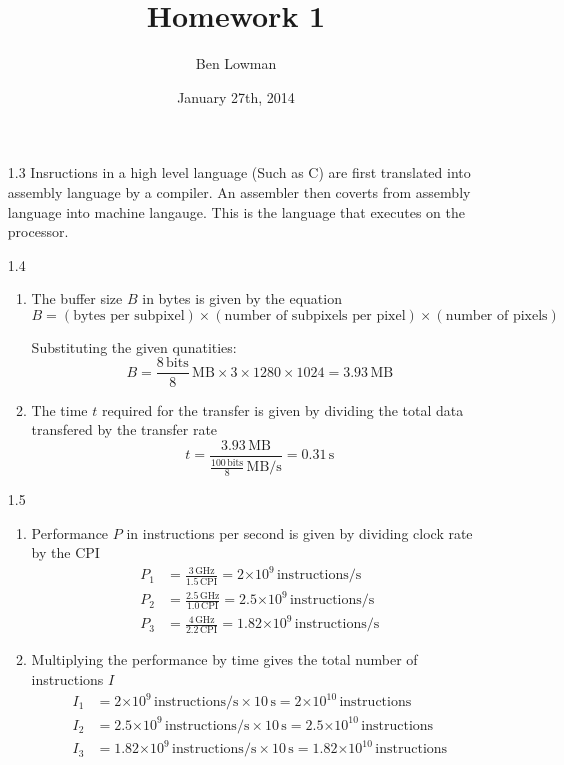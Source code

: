 \documentclass[12pt]{article}
\title{\textbf{Homework 1}}
\author{Ben Lowman}
\date{January 27th, 2014}
\newcommand{\e}[1]{\ensuremath{\times 10^{#1}}}
\newcommand{\un}[1]{\ensuremath{\, \mathrm{#1}}}
\begin{document}
\maketitle

\begin{itemize}
	
	\item [1.3] Insructions in a high level language (Such as C) are first translated into assembly language by a compiler. An assembler then coverts from assembly language into machine langauge. This is the language that executes on the processor.
	
	\item [1.4]
	\begin{enumerate}
		\item The buffer size $B$ in bytes is given by the equation
			\[B = (\text{bytes per subpixel}) \times (\text{number of subpixels per pixel}) \times (\text{number of pixels})\]

			Substituting the given qunatities:
			\[B = \frac{8\un{bits}}{8}\un{MB} \times 3 \times 1280 \times 1024 = 3.93 \un{MB}\]
		\item The time $t$ required for the transfer is given by dividing the total data transfered by the transfer rate
			\[t = \frac{3.93 \un{MB}}{\frac{100\un{bits}}{8} \un{MB/s}} =0.31 \un{s} \]
	\end{enumerate}

	\item [1.5]
	\begin{enumerate}
		\item Performance $P$ in instructions per second is given by dividing clock rate by the CPI 
			\begin{align*}
				P_1 &= \frac{3 \un{GHz}}{1.5\un{CPI}} = 2\e{9}\un{instructions/s}\\
				P_2 &= \frac{2.5 \un{GHz}}{1.0\un{CPI}} = 2.5\e{9}\un{instructions/s} \\
				P_3 &= \frac{4 \un{GHz}}{2.2\un{CPI}} = 1.82\e{9}\un{instructions/s}
			\end{align*}

		\item Multiplying the performance by time gives the total number of instructions $I$
			\begin{align*}
				I_1 &= 2\e{9}\un{instructions/s} \times 10\un{s} = 2\e{10}\un{instructions}\\
				I_2 &= 2.5\e{9}\un{instructions/s} \times 10\un{s} = 2.5\e{10}\un{instructions} \\
				I_3 &= 1.82\e{9}\un{instructions/s} \times 10\un{s} = 1.82\e{10}\un{instructions}
			\end{align*}
			

\end{enumerate}
\end{itemize}
\end{document}
